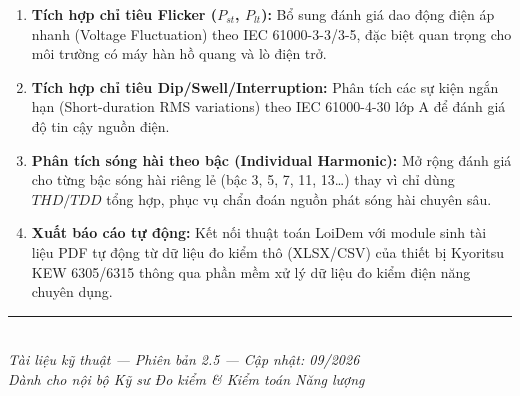 \documentclass[12pt,a4paper]{article}
\begin{document}
\begin{enumerate}
  \item \textbf{Tích hợp chỉ tiêu Flicker ($P_{st}$, $P_{lt}$):} Bổ sung đánh giá dao động điện áp nhanh (Voltage Fluctuation) theo IEC 61000-3-3/3-5, đặc biệt quan trọng cho môi trường có máy hàn hồ quang và lò điện trở.
  \item \textbf{Tích hợp chỉ tiêu Dip/Swell/Interruption:} Phân tích các sự kiện ngắn hạn (Short-duration RMS variations) theo IEC 61000-4-30 lớp A để đánh giá độ tin cậy nguồn điện.
  \item \textbf{Phân tích sóng hài theo bậc (Individual Harmonic):} Mở rộng đánh giá cho từng bậc sóng hài riêng lẻ (bậc 3, 5, 7, 11, 13\ldots) thay vì chỉ dùng $THD/TDD$ tổng hợp, phục vụ chẩn đoán nguồn phát sóng hài chuyên sâu.
  \item \textbf{Xuất báo cáo tự động:} Kết nối thuật toán LoiDem với module sinh tài liệu PDF tự động từ dữ liệu đo kiểm thô (XLSX/CSV) của thiết bị Kyoritsu KEW 6305/6315 thông qua phần mềm xử lý dữ liệu đo kiểm điện năng chuyên dụng.
\end{enumerate}

\vspace{1.5em}
\begin{center}
\rule{0.5\textwidth}{0.8pt}\\[0.5em]
{\small\sffamily\itshape Tài liệu kỹ thuật --- Phiên bản 2.5 --- Cập nhật: 09/2026\\
Dành cho nội bộ Kỹ sư Đo kiểm \& Kiểm toán Năng lượng}
\end{center}
\end{document}
